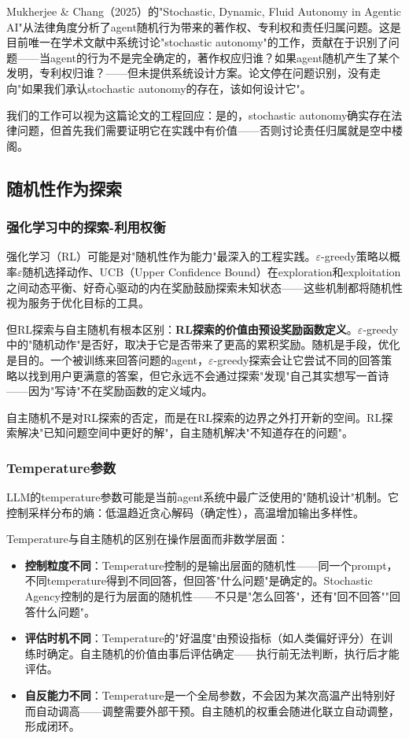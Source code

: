 \documentclass[12pt,a4paper]{ctexart}
\begin{document}
Mukherjee \& Chang（2025）的"Stochastic, Dynamic, Fluid Autonomy in Agentic AI"\cite{mukherjee2025}从法律角度分析了agent随机行为带来的著作权、专利权和责任归属问题。这是目前唯一在学术文献中系统讨论"stochastic autonomy"的工作，贡献在于识别了问题——当agent的行为不是完全确定的，著作权应归谁？如果agent随机产生了某个发明，专利权归谁？——但未提供系统设计方案。论文停在问题识别，没有走向"如果我们承认stochastic autonomy的存在，该如何设计它"。

我们的工作可以视为这篇论文的工程回应：是的，stochastic autonomy确实存在法律问题，但首先我们需要证明它在实践中有价值——否则讨论责任归属就是空中楼阁。

\subsection{随机性作为探索}

\subsubsection{强化学习中的探索-利用权衡}

强化学习（RL）可能是对"随机性作为能力"最深入的工程实践。$\varepsilon$-greedy策略以概率$\varepsilon$随机选择动作、UCB（Upper Confidence Bound）在exploration和exploitation之间动态平衡、好奇心驱动的内在奖励鼓励探索未知状态——这些机制都将随机性视为服务于优化目标的工具。

但RL探索与自主随机有根本区别：\textbf{RL探索的价值由预设奖励函数定义}。$\varepsilon$-greedy中的"随机动作"是否好，取决于它是否带来了更高的累积奖励。随机是手段，优化是目的。一个被训练来回答问题的agent，$\varepsilon$-greedy探索会让它尝试不同的回答策略以找到用户更满意的答案，但它永远不会通过探索"发现"自己其实想写一首诗——因为"写诗"不在奖励函数的定义域内。

自主随机不是对RL探索的否定，而是在RL探索的边界之外打开新的空间。RL探索解决"已知问题空间中更好的解"，自主随机解决"不知道存在的问题"。

\subsubsection{Temperature参数}

LLM的temperature参数可能是当前agent系统中最广泛使用的"随机设计"机制。它控制采样分布的熵：低温趋近贪心解码（确定性），高温增加输出多样性。

Temperature与自主随机的区别在操作层面而非数学层面：

\begin{itemize}[nosep]
\item \textbf{控制粒度不同}：Temperature控制的是输出层面的随机性——同一个prompt，不同temperature得到不同回答，但回答"什么问题"是确定的。Stochastic Agency控制的是行为层面的随机性——不只是"怎么回答"，还有"回不回答""回答什么问题"。
\item \textbf{评估时机不同}：Temperature的"好温度"由预设指标（如人类偏好评分）在训练时确定。自主随机的价值由事后评估确定——执行前无法判断，执行后才能评估。
\item \textbf{自反能力不同}：Temperature是一个全局参数，不会因为某次高温产出特别好而自动调高——调整需要外部干预。自主随机的权重会随进化联立自动调整，形成闭环。
\end{itemize}
\end{document}
